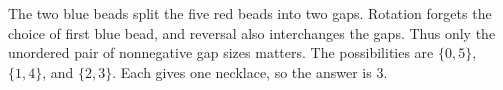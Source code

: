 The two blue beads split the five red beads into two gaps. Rotation forgets the choice of first blue bead, and reversal also interchanges the gaps. Thus only the unordered pair of nonnegative gap sizes matters. The possibilities are $\{0,5\}$, $\{1,4\}$, and $\{2,3\}$. Each gives one necklace, so the answer is $\boxed3$.
